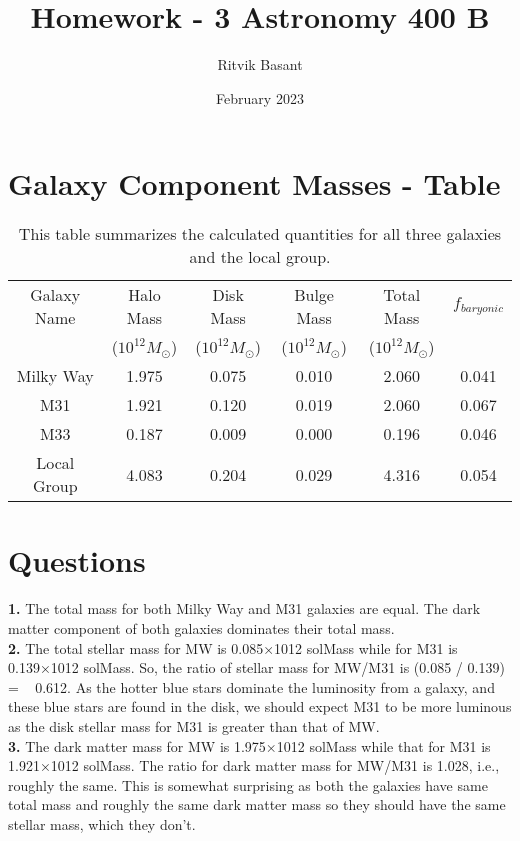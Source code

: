 \documentclass{article}
\title{Homework - 3 Astronomy 400 B}
\author{Ritvik Basant}
\date{February 2023}
\begin{document}
\maketitle

\section{Galaxy Component Masses - Table}

\begin{table}[ht]
    \centering
    \begin{tabular}{cccccc}
    \hline
        Galaxy Name & Halo Mass & Disk Mass & Bulge Mass & Total Mass & $f_{baryonic}$\\
         & ($10^{12} M_{\odot}$) & ($10^{12} M_{\odot}$) & ($10^{12} M_{\odot}$) & ($10^{12} M_{\odot}$) & \\
        \hline
        Milky Way & 1.975 & 0.075 & 0.010 & 2.060 & 0.041 \\
        M31 & 1.921 & 0.120 & 0.019 & 2.060 & 0.067 \\
        M33 & 0.187 & 0.009 & 0.000 & 0.196 & 0.046 \\
        \hline
        Local Group & 4.083 & 0.204 & 0.029 & 4.316 & 0.054\\
        \hline
    \end{tabular}
    \caption{This table summarizes the calculated quantities for all three galaxies and the local group.}
    \label{tab:datap}
\end{table}

\section{Questions}
\textbf{1.}	The total mass for both Milky Way and M31 galaxies are equal. The dark matter component of both galaxies dominates their total mass. \\

\noindent \textbf{2.}	The total stellar mass for MW is 0.085×1012 solMass while for M31 is 0.139×1012 solMass. So, the ratio of stellar mass for MW/M31 is (0.085 / 0.139) = ~ 0.612. As the hotter blue stars dominate the luminosity from a galaxy, and these blue stars are found in the disk, we should expect M31 to be more luminous as the disk stellar mass for M31 is greater than that of MW. \\

\noindent \textbf{3.}	The dark matter mass for MW is 1.975×1012 solMass while that for M31 is 1.921×1012 solMass. The ratio for dark matter mass for MW/M31 is 1.028, i.e., roughly the same. This is somewhat surprising as both the galaxies have same total mass and roughly the same dark matter mass so they should have the same stellar mass, which they don’t. \\
\end{document}
